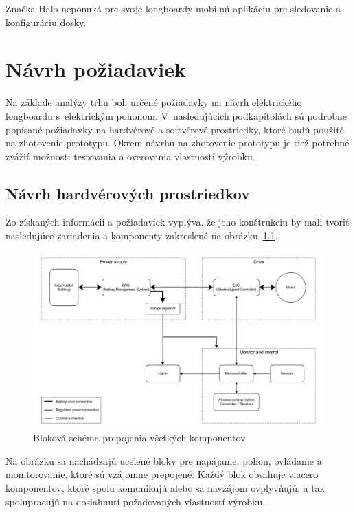 Značka Halo neponuká pre svoje longboardy mobilnú aplikáciu pre sledovanie a konfiguráciu dosky.\cite{Halo}

\chapter{Návrh požiadaviek}\label{navrh}
Na základe analýzy trhu boli určené požiadavky na návrh elektrického longboardu s~elektrickým pohonom.
V~nasledujúcich podkapitolách sú podrobne popísané požiadavky na hardvérové a softvérové prostriedky, ktoré budú použité na zhotovenie prototypu.
Okrem návrhu na zhotovenie prototypu je tiež potrebné zvážiť možnosti testovania a overovania vlastností výrobku.


\section{Návrh hardvérových prostriedkov}
Zo získaných informácií a požiadaviek vyplýva, že jeho konštrukciu by mali tvoriť nasledujúce zariadenia a komponenty zakreslené na obrázku~\ref{fig:blokova_schema}.

\begin{figure}[h]
    \centering
    \includegraphics[width=1\textwidth]{figures/block-diagram.pdf}
    \caption{Bloková schéma prepojenia všetkých komponentov}\label{fig:blokova_schema}
\end{figure}

Na obrázku sa nachádzajú ucelené bloky pre napájanie, pohon, ovládanie a monitorovanie, ktoré sú vzájomne prepojené.
Každý blok obsahuje viacero komponentov, ktoré spolu komunikujú alebo sa navzájom ovplyvňujú, a tak spolupracujú na dosiahnutí požadovaných vlastností výrobku.

